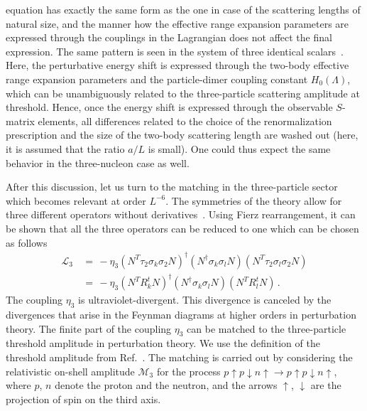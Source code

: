 \documentclass[12pt,prd,tightenlines,nofootinbib]{revtex4-2}
\begin{document}
equation has exactly the same form as the one in case of the scattering lengths of
natural size, and the manner
how the effective range expansion parameters are expressed through the
couplings in the Lagrangian does not affect the final expression. The same pattern is seen
in the system of three identical scalars~\cite{Pang:2019dfe}. Here, the perturbative
energy shift is expressed through the two-body effective range expansion parameters
and the particle-dimer coupling constant $H_0(\Lambda)$, which can be unambiguously related to the three-particle scattering amplitude at threshold. Hence, once the energy shift
is expressed through the observable $S$-matrix elements, all differences related to the choice of the renormalization prescription and the size of the two-body scattering length are washed out (here, it is assumed that the ratio $a/L$ is small). One could thus expect the same behavior in the three-nucleon case as well.  

After this discussion, let us turn to the matching in the three-particle sector which
becomes relevant at order $L^{-6}$.
The symmetries of the theory allow for three different operators without
derivatives~\cite{Bedaque:1999ve}. 
Using Fierz rearrangement, it can be shown that all the three operators can be reduced to one which can be chosen as follows
\begin{align}
    \mathscr{L}_{3}\, &=\,- \eta_{3}(N^{T}\tau_{2}\sigma_{k}\sigma_{2}N)^{\dagger}(N^{\dagger}\sigma_{k}\sigma_{l}N)(N^{T}\tau_{2}\sigma_{l}\sigma_{2}N)\nonumber\\[2mm]
    &= \, -\eta_{3}(N^{T}R^{t}_{k}N)^{\dagger}(N^{\dagger}\sigma_{k}\sigma_{l}N)(N^{T}R^{t}_{l}N)\,.
\end{align}
The coupling $\eta_{3}$ is ultraviolet-divergent. This divergence is canceled by the divergences that arise in the Feynman diagrams at higher orders in perturbation theory.
The finite part of the coupling $\eta_3$ can be matched to the three-particle threshold amplitude in perturbation theory. 
We use the definition of the threshold amplitude from
Ref.~\cite{Romero-Lopez:2020rdq}. The matching is carried out by considering
the relativistic on-shell amplitude $\mathscr{M}_{3}$ for the process
$p \uparrow p \downarrow n \uparrow \to p \uparrow p \downarrow n \uparrow$, where
$p$, $n$ denote the proton and the neutron,
and the arrows $\uparrow$, $\downarrow$ are the projection of spin on the third axis.
\end{document}
